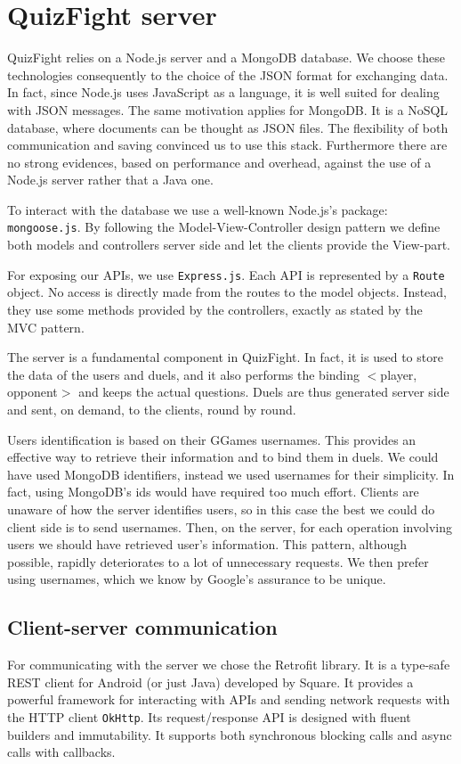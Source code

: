 \section{QuizFight server}

QuizFight relies on a Node.js server and a MongoDB database.
We choose these technologies consequently to the choice of the JSON format for
exchanging data.
In fact, since Node.js uses JavaScript as a language, it is well suited for
dealing with JSON messages.
The same motivation applies for MongoDB. It is a NoSQL database, where
documents can be thought as JSON files.
The flexibility of both communication and saving convinced us to use this
stack.
Furthermore there are no strong evidences, based on performance and overhead,
against the use of a Node.js server rather that a Java one. 

To interact with the database we use a well-known Node.js's package:
\texttt{mongoose.js}.
By following the Model-View-Controller design pattern we define both
models and controllers server side and let the clients provide the View-part.

For exposing our APIs, we use \texttt{Express.js}.
Each API is represented by a \texttt{Route} object.
No access is directly made from the routes to the model objects.
Instead, they use some methods provided by the controllers, exactly as stated
by the MVC pattern.

The server is a fundamental component in QuizFight. In fact, it is used to
store the data of the users and duels, and it also performs the binding
$<$player, opponent$>$ and keeps the actual questions.
Duels are thus generated server side and sent, on demand, to the clients,
round by round.

Users identification is based on their GGames usernames.
This provides an effective way to retrieve their information and to bind
them in duels.
We could have used MongoDB identifiers, instead we used usernames for their
simplicity.
In fact, using MongoDB's ids would have required too much effort.
Clients are unaware of how the server identifies users, so in this case the
best we could do client side is to send usernames.
Then, on the server, for each operation involving users we should have
retrieved user's information.
This pattern, although possible, rapidly deteriorates to a lot of unnecessary
requests.
We then prefer using usernames, which we know by Google's assurance to be
unique.

\subsection{Client-server communication}
For communicating with the server we chose the Retrofit library. It is a 
type-safe REST client for Android (or just Java) developed by Square. 
It provides a powerful framework for interacting with APIs and sending 
network requests with the HTTP client \texttt{OkHttp}. Its request/response
API is designed with fluent builders and immutability. It supports both 
synchronous blocking calls and async calls with callbacks. 

